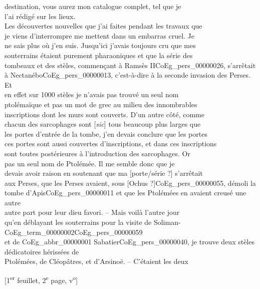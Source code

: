 \documentclass{book}
\begin{document}
destination, vous aurez mon catalogue complet, tel que je\\
l’ai rédigé sur les lieux.\\
\indent Les découvertes nouvelles que j’ai faites pendant les travaux que\\
je viens d’interrompre me mettent dans un embarras cruel. Je\\
ne sais plus où j’en suis. Jusqu’ici j’avais toujours cru que mes\\
souterrains étaient purement pharaoniques et que la série des\\
tombeaux et des stèles, commençant à Ramsès II\gls{CoEg_pers_00000026}, s’arrêtait\\
à Nectanébo\gls{CoEg_pers_00000013}, c’est-à-dire à la seconde invasion des Perses. Et\\
en effet sur 1000 stèles je n’avais pas trouvé un seul nom\\
ptolémaïque et pas un mot de grec au milieu des innombrables\\
inscriptions dont les murs sont couverts. D’un autre côté, comme\\
chacun des sarcophages sont {[\textit{sic}]} tous beaucoup plus larges que\\
les portes d’entrée de la tombe, j’en devais conclure que les portes\\
ces portes sont aussi couvertes d’inscriptions, et dans ces inscriptions\\
sont toutes postérieures à l’introduction des sarcophages. Or\\
pas un seul nom de Ptolémée. Il me semble donc que je\\
devais avoir raison en soutenant que ma {[porte/série ?]} s’arrêtait\\
aux Perses, que les Perses avaient, sous {[Ochus ?]}\gls{CoEg_pers_00000055}, démoli la\\
tombe d’Apis\gls{CoEg_pers_00000011} et que les Ptolémées en avaient creusé une autre\\
autre part pour leur dieu favori. – Mais voilà l’autre jour\\
qu’en déblayant les souterrains pour la visite de Soliman-\Gls{CoEg_term_00000002}\gls{CoEg_pers_00000059}\\
et de \gls{CoEg_abbr_00000001} Sabatier\gls{CoEg_pers_00000040}, je trouve deux stèles dédicatoires hérissées de\\
Ptolémées, de Cléopâtres, et d’Arsinoë. – C’étaient les deux
{\footnotesize\begin{center} {[1\textsuperscript{er} feuillet, 2\textsuperscript{e} page, v\textsuperscript{o}]}\end{center}}
\end{document}
